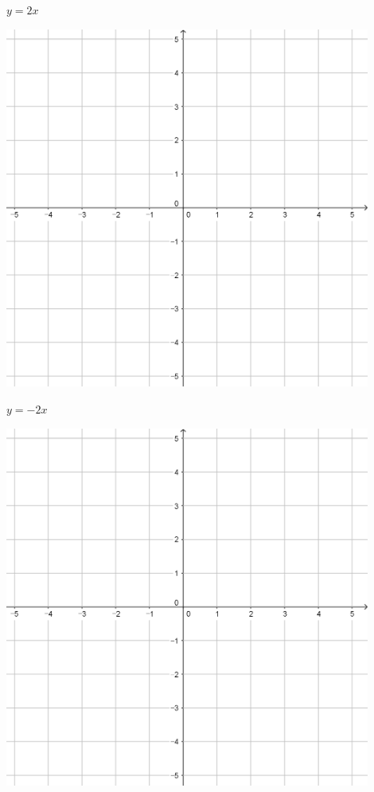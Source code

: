 \documentclass[a4paper]{oblivoir}
\begin{document}
\begin{minipage}{0.45\textwidth}\centering
\(y=2x\)
\par\bigskip\includegraphics[width=0.9\textwidth]{55}
\end{minipage}
\begin{minipage}{0.45\textwidth}\centering
\(y=-2x\)
\par\bigskip\includegraphics[width=0.9\textwidth]{55}
\end{minipage}\bigskip\bigskip\par
\end{document}
